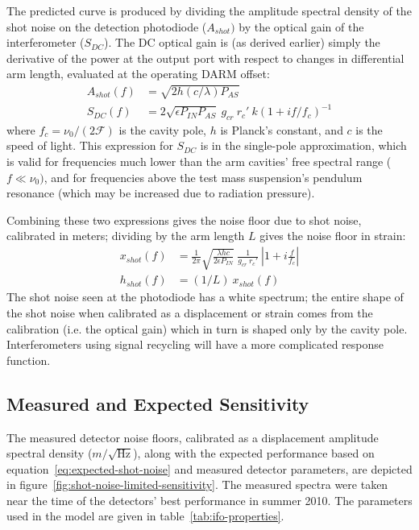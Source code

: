 The predicted curve is produced by dividing the amplitude spectral density of
the shot noise on the detection photodiode ($A_{shot})$ by the optical gain of
the interferometer ($S_{DC}$). The DC optical gain is (as derived earlier) simply
the derivative of the power at the output port with respect to changes in
differential arm length, evaluated at the operating DARM offset:
%
\begin{align}
A_{shot}(f) &= \sqrt{2 h (c/\lambda) P_{AS}} \\
S_{DC}(f) &= 2 \sqrt{\epsilon P_{IN} P_{AS}}\ g_{cr}\ r_c'\ k\left(1 + i f/f_c\right)^{-1}
\end{align}
%
where $f_c = \nu_0 / (2\mathcal{F})$ is the cavity pole, $h$ is Planck's
constant, and $c$ is the speed of light.  This expression for $S_{DC}$ is in the single-pole
approximation, which is valid for frequencies much lower than the arm cavities'
free spectral range ($f\ll \nu_0)$, and for frequencies above the test mass
suspension's pendulum resonance (which may be increased due to radiation
pressure).

Combining these two expressions gives the noise floor due to shot noise,
calibrated in meters; dividing by the arm length $L$ gives the noise floor in strain:
%
\begin{align}
x_{shot}(f) & = \frac{1}{2\pi} \sqrt{\frac{\lambda h c}{2 \epsilon P_{IN}}}\ \frac{1}{g_{cr}\ r_c'}
\ \left|1 + i \frac{f}{f_c}\right| \\
h_{shot}(f) &= (1/L)\ x_{shot}(f)
\label{eq:expected-shot-noise}
\end{align}
%
The shot noise seen at the photodiode has a white spectrum; the entire shape of
the shot noise when calibrated as a displacement or strain comes from the
calibration (i.e. the optical gain) which in turn is shaped only by the cavity
pole.  Interferometers using signal recycling will have a more complicated
response function.

\subsection{Measured and Expected Sensitivity}
The measured detector noise floors, calibrated as a displacement amplitude
spectral density ($m/\sqrt{\text{Hz}}$), along with the expected performance
based on equation~\ref{eq:expected-shot-noise} and measured detector parameters,
are depicted in figure~\ref{fig:shot-noise-limited-sensitivity}.  The measured
spectra were taken near the time of the detectors' best performance in
summer 2010.  The parameters used in the model are given in
table~\ref{tab:ifo-properties}.  

